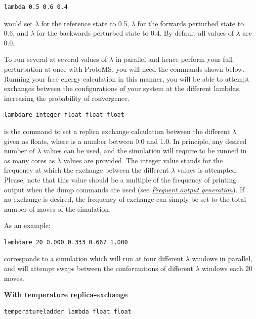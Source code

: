 \documentclass[letterpaper,10pt,english]{sphinxmanual}
\begin{document}
\begin{Verbatim}[commandchars=\\\{\}]
lambda 0.5 0.6 0.4
\end{Verbatim}

would set \(\lambda\) for the reference state to 0.5, \(\lambda\) for the forwards perturbed state to 0.6, and \(\lambda\) for the backwards perturbed state to 0.4. By default all values of \(\lambda\) are 0.0.

To run several at several values of \(\lambda\)  in parallel and hence perform your full perturbation at once with ProtoMS, you will need the commands shown below. Running your free energy calculation in this manner, you will be able to attempt exchanges between the configurations of your system at the different lambdas, increasing the probability of convergence.

\begin{Verbatim}[commandchars=\\\{\}]
lambdare integer float float float
\end{Verbatim}

is the command to set a replica exchange calculation between the different \(\lambda\) given as floats, where  is a number between 0.0 and 1.0. In principle, any desired number of \(\lambda\) values can be used, and the simulation will require to be runned in as many cores as \(\lambda\) values are provided. The integer value stands for the frequency at which the exchange between the different \(\lambda\) values is attempted. Please, note that this value should be a multiple of the frequency of printing output when the dump commands are used (see {\hyperref[protoms:frequent-output-generation]{\emph{Frequent output generation}}}). If no exchange is desired, the frequency of exchange can simply be set to the total number of moves of the simulation.

As an example:

\begin{Verbatim}[commandchars=\\\{\}]
lambdare 20 0.000 0.333 0.667 1.000
\end{Verbatim}

corresponds to a simulation which will run at four different \(\lambda\) windows in parallel, and will attempt swaps between the conformations of different \(\lambda\) windows each 20 moves.

\textbf{With temperature replica-exchange}

\begin{Verbatim}[commandchars=\\\{\}]
temperatureladder lambda float float
\end{Verbatim}
\end{document}
